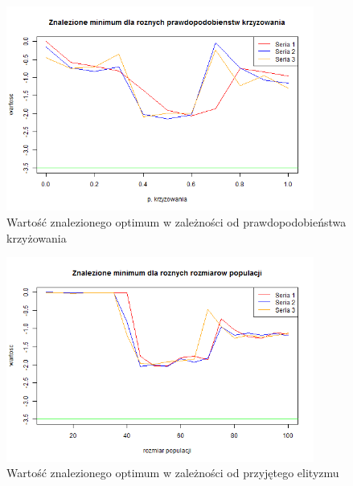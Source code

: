 \documentclass[11pt, a4paper]{article}
\begin{document}
\begin{figure}[H]
	\begin{center}
		\includegraphics[width=0.9\textwidth]{./assets/Zeldasine203.png} %
		\caption{Wartość znalezionego optimum w zależności od prawdopodobieństwa krzyżowania}
		\label{fig:zeldasine3}
	\end{center}
\end{figure}

\begin{figure}[H]
	\begin{center}
		\includegraphics[width=0.9\textwidth]{./assets/Zeldasine204.png} %
		\caption{Wartość znalezionego optimum w zależności od przyjętego elityzmu}
		\label{fig:zeldasine4}
	\end{center}
\end{figure}
\end{document}
